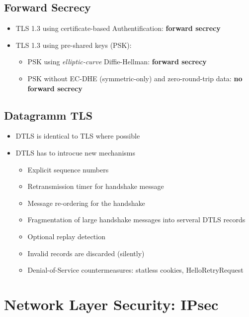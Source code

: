 \subsection{Forward Secrecy}
\begin{itemize}
  \item TLS 1.3 using certificate-based Authentification: \textbf{forward secrecy}
  \item TLS 1.3 using pre-shared keys (PSK):
    \begin{itemize}
      \item PSK using \textit{elliptic-curve} Diffie-Hellman: \textbf{forward secrecy}
      \item PSK without EC-DHE (symmetric-only) and zero-round-trip data: \textbf{no forward secrecy}
    \end{itemize}
\end{itemize}

\subsection{Datagramm TLS}
\begin{itemize}
  \item DTLS is identical to TLS where possible
  \item DTLS has to introcue new mechanisms
    \begin{itemize}
      \item Explicit sequence numbers
      \item Retransmission timer for handshake message
      \item Message re-ordering for the handshake
      \item Fragmentation of large handshake messages into serveral DTLS records
      \item Optional replay detection
      \item Invalid records are discarded (silently)
      \item Denial-of-Service countermeasures: statless cookies, HelloRetryRequest
    \end{itemize}
\end{itemize}

\section{Network Layer Security: IPsec}
